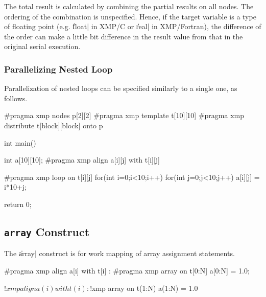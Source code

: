 \begin{mynote}
  The total result is calculated by combining the partial results on all
  nodes. The ordering of the combination is unspecified.
%
  Hence, if the target variable is a type of floating
  point (e.g. \|float| in XMP/C or \|real| in XMP/Fortran), the
  difference of the order can make a little bit
  difference in the result value from that in the original serial
  execution.
\end{mynote}


\subsubsection{Parallelizing Nested Loop}

Parallelization of nested loops can be specified similarly to a single
one, as follows.

\begin{XCexample}
#pragma xmp nodes p[2][2]
#pragma xmp template t[10][10]
#pragma xmp distribute t[block][block] onto p

int main(){
  int a[10][10];
#pragma xmp align a[i][j] with t[i][j]

#pragma xmp loop on t[i][j]
  for(int i=0;i<10;i++)
    for(int j=0;j<10;j++)
      a[i][j] = i*10+j;

  return 0;
}
\end{XCexample}



\subsection{{\tt array} Construct}

The \|array| construct is for work mapping of array assignment statements.

\begin{XCexample}
#pragma xmp align a[i] with t[i]
  :
#pragma xmp array on t[0:N]
a[0:N] = 1.0;
\end{XCexample}

\begin{XFexample}
!$xmp align a(i) with t(i)
  :
!$xmp array on t(1:N)
a(1:N) = 1.0
\end{XFexample}

